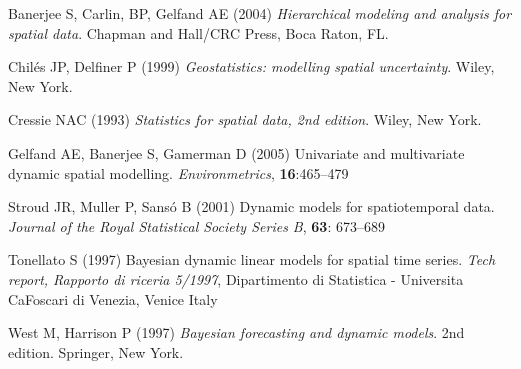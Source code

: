 \documentclass{article}
\begin{document}
\begin{description}  
\item Banerjee S, Carlin, BP, Gelfand AE (2004) \emph{Hierarchical modeling and analysis for spatial data}. Chapman and Hall/CRC Press, Boca Raton, FL.

\item Chil\'{e}s JP, Delfiner P (1999) \emph{Geostatistics: modelling spatial uncertainty}. Wiley, New York.

\item Cressie NAC (1993) \emph{Statistics for spatial data, 2nd edition}. Wiley, New York.

\item Gelfand AE, Banerjee S, Gamerman D (2005) Univariate and multivariate dynamic spatial modelling. \emph{Environmetrics}, \textbf{16}:465--479

\item Stroud JR, Muller P, Sans\'{o} B (2001) Dynamic models for spatiotemporal data. \emph{Journal of the Royal Statistical Society Series B}, \textbf{63}: 673--689
  
\item Tonellato S (1997) Bayesian dynamic linear models for spatial time series. \emph{Tech report, Rapporto di riceria 5/1997}, Dipartimento di Statistica - Universita CaFoscari di Venezia, Venice Italy

\item West M, Harrison P (1997) \emph{Bayesian forecasting and dynamic models}. 2nd edition. Springer, New York.
\end{description}
 
\end{document}
